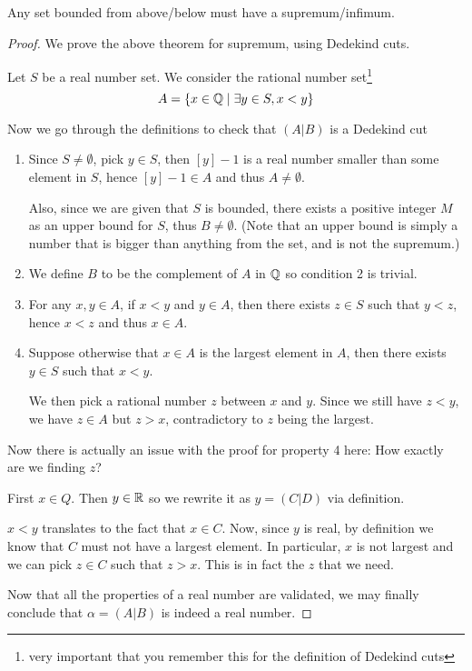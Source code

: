 \begin{thrm}{}{}
Any set bounded from above/below must have a supremum/infimum.
\end{thrm}
\begin{proof}
We prove the above theorem for supremum, using Dedekind cuts.

Let $S$ be a real number set. We consider the rational number set\footnote{very important that you remember this for the definition of Dedekind cuts}
\[ A = \{x \in \mathbb Q \mid \exists y \in S, x<y\} \]

Now we go through the definitions to check that $(A|B)$ is a Dedekind cut
\begin{enumerate}
\item Since $S\neq\emptyset$, pick $y\in S$, then $[y]-1$ is a real number smaller than some element in $S$, hence $[y]-1 \in A$ and thus $A\neq\emptyset$.

Also, since we are given that $S$ is bounded, there exists a positive integer $M$ as an upper bound for $S$, thus $B\neq\emptyset$. (Note that an upper bound is simply a number that is bigger than anything from the set, and is not the supremum.)

\item We define $B$ to be the complement of $A$ in $\mathbb Q$ so condition 2 is trivial.

\item For any $x,y\in A$, if $x<y$ and $y\in A$, then there exists $z\in S$ such that $y<z$, hence $x<z$ and thus $x\in A$.

\item Suppose otherwise that $x\in A$ is the largest element in $A$, then there exists $y\in S$ such that $x<y$.

We then pick a rational number $z$ between $x$ and $y$. Since we still have $z<y$, we have $z\in A$ but $z>x$, contradictory to $z$ being the largest.
\end{enumerate}

Now there is actually an issue with the proof for property 4 here: How exactly are we finding $z$?

First $x\in Q$. Then $y\in\mathbb R$ so we rewrite it as $y=(C|D)$ via definition.

$x<y$ translates to the fact that $x\in C$. Now, since $y$ is real, by definition we know that $C$ must not have a largest element. In particular, $x$ is not largest and we can pick $z\in C$ such that $z>x$. This is in fact the $z$ that we need.

Now that all the properties of a real number are validated, we may finally conclude that $\alpha=(A|B)$ is indeed a real number.



\end{proof}
